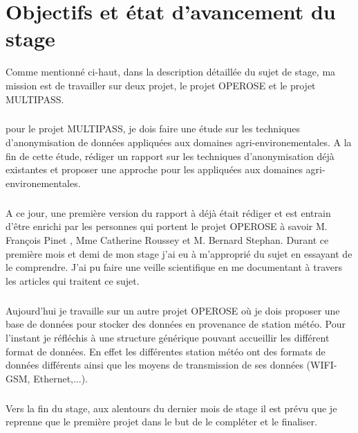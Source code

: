 \chapter{Objectifs et état d'avancement du stage}
Comme mentionné ci-haut, dans la description détaillée du sujet de stage, ma mission est de travailler sur deux projet, le projet OPEROSE et le projet MULTIPASS. 

\paragraph{}
pour le projet MULTIPASS, je dois faire une étude sur les techniques d'anonymisation de données appliquées aux domaines agri-environementales. A la fin de cette étude, rédiger un rapport sur les techniques d'anonymisation déjà existantes et proposer une approche pour les appliquées aux domaines agri-environementales.
\paragraph{}
A ce jour, une première version du rapport à déjà était rédiger et est entrain d'être enrichi par les personnes qui portent le projet OPEROSE à savoir M. François Pinet , Mme Catherine Roussey  et M. Bernard Stephan. Durant ce première mois et demi de mon stage j'ai eu à m'approprié du sujet en essayant de le comprendre. J'ai pu faire une veille scientifique en me documentant à travers les articles qui traitent ce sujet. 

\paragraph{}
Aujourd'hui je travaille sur un autre projet OPEROSE où je dois proposer une base de données pour stocker des données en provenance de station météo. Pour l'instant je réfléchis à une structure générique pouvant accueillir les différent format de données. En effet les différentes station météo ont des formats de données différents ainsi que les moyens de transmission de ses données (WIFI-GSM, Ethernet,...).


\paragraph{}
Vers la fin du stage, aux alentours du dernier mois de stage il est prévu que je reprenne que le première projet dans le but de le compléter et le finaliser.

